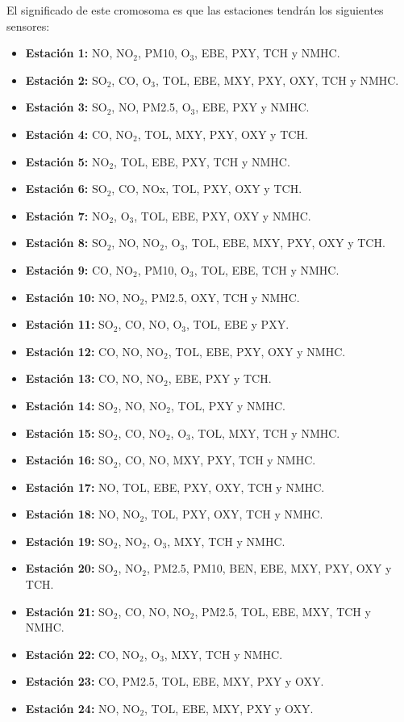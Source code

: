 \documentclass[12pt, spanish, pdftex]{UC3M_document}
\begin{document}
El significado de este cromosoma es que las estaciones tendrán los siguientes sensores:
\begin{itemize}
	\item \textbf{Estación 1:} NO, NO$_2$, PM10, O$_3$, EBE, PXY, TCH y NMHC.
	\item \textbf{Estación 2:} SO$_2$, CO, O$_3$, TOL, EBE, MXY, PXY, OXY, TCH y NMHC.
	\item \textbf{Estación 3:} SO$_2$, NO, PM2.5, O$_3$, EBE, PXY y NMHC.
	\item \textbf{Estación 4:} CO, NO$_2$, TOL, MXY, PXY, OXY y TCH.
	\item \textbf{Estación 5:} NO$_2$, TOL, EBE, PXY, TCH y NMHC.
	\item \textbf{Estación 6:} SO$_2$, CO, NOx, TOL, PXY, OXY y TCH.
	\item \textbf{Estación 7:} NO$_2$, O$_3$, TOL, EBE, PXY, OXY y NMHC.
	\item \textbf{Estación 8:} SO$_2$, NO, NO$_2$, O$_3$, TOL, EBE, MXY, PXY, OXY y TCH.
	\item \textbf{Estación 9:} CO, NO$_2$, PM10, O$_3$, TOL, EBE, TCH y NMHC.
	\item \textbf{Estación 10:} NO, NO$_2$, PM2.5, OXY, TCH y NMHC.
	\item \textbf{Estación 11:} SO$_2$, CO, NO, O$_3$, TOL, EBE y PXY.
	\item \textbf{Estación 12:} CO, NO, NO$_2$, TOL, EBE, PXY, OXY y NMHC.
	\item \textbf{Estación 13:} CO, NO, NO$_2$, EBE, PXY y TCH.
	\item \textbf{Estación 14:} SO$_2$, NO, NO$_2$, TOL, PXY y NMHC.
	\item \textbf{Estación 15:} SO$_2$, CO, NO$_2$, O$_3$, TOL, MXY, TCH y NMHC.
	\item \textbf{Estación 16:} SO$_2$, CO, NO, MXY, PXY, TCH y NMHC.
	\item \textbf{Estación 17:} NO, TOL, EBE, PXY, OXY, TCH y NMHC.
	\item \textbf{Estación 18:} NO, NO$_2$, TOL, PXY, OXY, TCH y NMHC.
	\item \textbf{Estación 19:} SO$_2$, NO$_2$, O$_3$, MXY, TCH y NMHC.
	\item \textbf{Estación 20:} SO$_2$, NO$_2$, PM2.5, PM10, BEN, EBE, MXY, PXY, OXY y TCH.
	\item \textbf{Estación 21:} SO$_2$, CO, NO, NO$_2$, PM2.5, TOL, EBE, MXY, TCH y NMHC.
	\item \textbf{Estación 22:} CO, NO$_2$, O$_3$, MXY, TCH y NMHC.
	\item \textbf{Estación 23:} CO, PM2.5, TOL, EBE, MXY, PXY y OXY.
	\item \textbf{Estación 24:} NO, NO$_2$, TOL, EBE, MXY, PXY y OXY.
\end{itemize}
\end{document}
